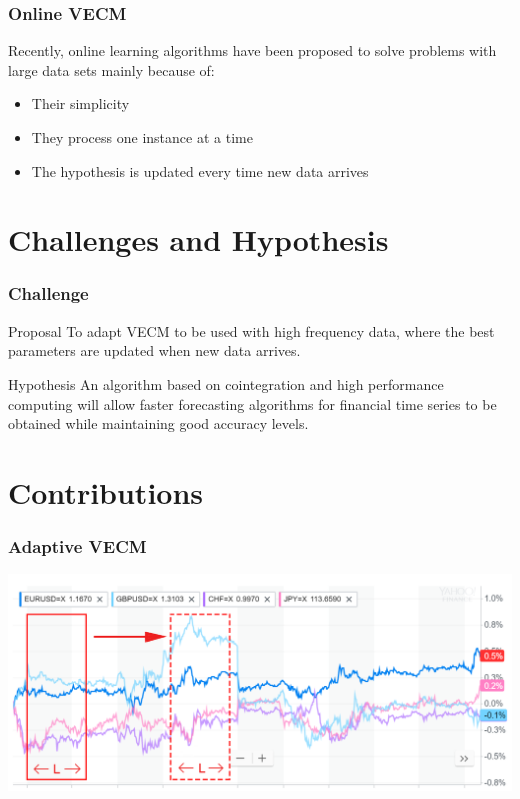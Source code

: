 \documentclass{beamer}
\begin{document}
\begin{frame}
\frametitle{Online VECM}
Recently, online learning algorithms have been proposed to solve problems with large data sets mainly because of: 
\begin{itemize}
\item Their simplicity
\item They process one instance at a time
\item The hypothesis is updated every time new data arrives
\end{itemize} 
\end{frame}


\section{Challenges and Hypothesis}
\begin{frame}
\frametitle{Challenge}
\begin{block}{Proposal}
To adapt VECM to be used with high frequency data, where the best parameters are updated when new data arrives.
\end{block}
\begin{exampleblock}{Hypothesis}
An algorithm based on cointegration and high performance computing will allow faster forecasting
algorithms for financial time series to be obtained while maintaining good accuracy levels.
\end{exampleblock}
\end{frame}

\section{Contributions}


\begin{frame}
\frametitle{Adaptive VECM}
\hspace*{-9mm}
\includegraphics[width=1.15\textwidth]{img/slidingwindow}
\end{frame}
\end{document}
